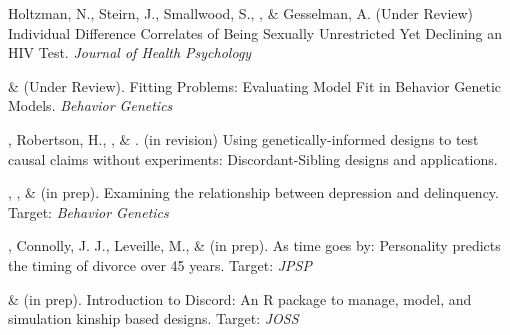 

\item Holtzman, N., Steirn, J., Smallwood, S., \meb, \& Gesselman, A. (Under Review) Individual Difference Correlates of Being Sexually Unrestricted Yet Declining an HIV Test. \textit{Journal of Health Psychology}

\item \meb \& \joe (Under Review). Fitting Problems: Evaluating Model Fit in Behavior Genetic Models. \textit{Behavior Genetics}


\item \meb, Robertson, H.\noteA, \jt, \& \joe. (in revision) Using genetically-informed designs to test causal claims without experiments: Discordant-Sibling designs and applications. \href{https://osf.io/zpdwt/}{\small\color{blue}{osf.io/zpdwt/}}%


\item \emsims, \jt, \& \meb (in prep). Examining the relationship between depression and delinquency. Target: \textit{Behavior Genetics}

\item \meb, Connolly, J. J., Leveille, M., \& \jjj (in prep). As time goes by: Personality predicts the timing of divorce over 45 years. Target: \textit{JPSP}
%


\item \jt \& \meb (in prep). Introduction to Discord: An R package to manage, model, and simulation kinship based designs. Target: \textit{JOSS}






